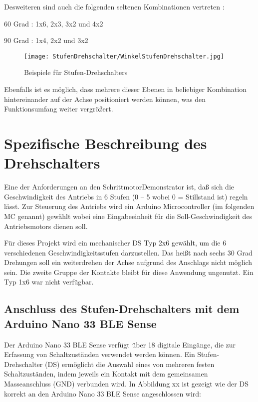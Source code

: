 Desweiteren sind auch die folgenden seltenen Kombinationen vertreten : 

60 Grad :  1x6, 2x3, 3x2 und 4x2 

90 Grad :  1x4, 2x2 und 3x2 


\begin{figure}[H]
	\centering
	\texttt{[image: StufenDrehschalter/WinkelStufenDrehschalter.jpg]}
	\caption{Beispiele für Stufen-Drehschalters}
	\label{fig:ArtenStufenDrehschalter}
\end{figure} 

Ebenfalls ist es möglich, dass mehrere dieser Ebenen in beliebiger Kombination hintereinander auf der Achse positioniert werden können, was den Funktionsumfang weiter vergrößert. 



\section{Spezifische Beschreibung des Drehschalters}

Eine der Anforderungen an den SchrittmotorDemonstrator  ist, daß sich die Geschwindigkeit des Antriebs in 6  Stufen (0 – 5 wobei 0 = Stillstand ist) regeln lässt. Zur Steuerung des Antriebs wird ein Arduino Microcontroller (im folgenden MC genannt) gewählt wobei eine Eingabeeinheit für die Soll-Geschwindigkeit des Antriebsmotors dienen soll. 

Für dieses Projekt wird ein mechanischer DS Typ 2x6 gewählt, um die 6 verschiedenen Geschwindigkeitsstufen darzustellen. Das heißt nach sechs 30 Grad Drehungen soll ein weiterdrehen der Achse aufgrund des Anschlags nicht möglich sein. Die zweite Gruppe der Kontakte bleibt für diese Anwendung ungenutzt. Ein Typ 1x6 war nicht verfügbar. 


\subsection{Anschluss des Stufen-Drehschalters mit dem Arduino Nano 33 BLE Sense}

Der Arduino Nano 33 BLE Sense verfügt über 18 digitale Eingänge, die zur Erfassung von Schaltzuständen verwendet werden können. Ein Stufen-Drehschalter (DS) ermöglicht die Auswahl eines von mehreren festen Schaltzuständen, indem jeweils ein Kontakt mit dem gemeinsamen Masseanschluss (GND) verbunden wird.
In Abbildung xx ist gezeigt wie der DS korrekt an den Arduino Nano 33 BLE Sense angeschlossen wird:

